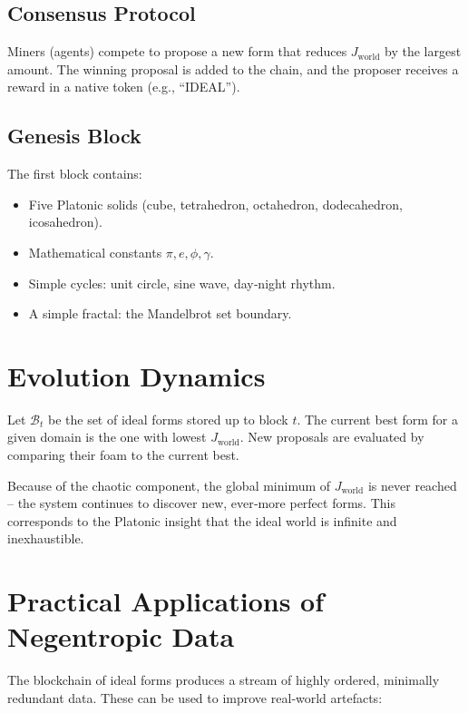 \documentclass[12pt,a4paper]{article}
\begin{document}
\subsection{Consensus Protocol}
Miners (agents) compete to propose a new form that reduces \(J_{\text{world}}\) by the largest amount. The winning proposal is added to the chain, and the proposer receives a reward in a native token (e.g., “IDEAL”).

\subsection{Genesis Block}
The first block contains:
\begin{itemize}
    \item Five Platonic solids (cube, tetrahedron, octahedron, dodecahedron, icosahedron).
    \item Mathematical constants \(\pi, e, \phi, \gamma\).
    \item Simple cycles: unit circle, sine wave, day‑night rhythm.
    \item A simple fractal: the Mandelbrot set boundary.
\end{itemize}

\section{Evolution Dynamics}

Let \(\mathcal{B}_t\) be the set of ideal forms stored up to block \(t\). The current best form for a given domain is the one with lowest \(J_{\text{world}}\). New proposals are evaluated by comparing their foam to the current best.

Because of the chaotic component, the global minimum of \(J_{\text{world}}\) is never reached – the system continues to discover new, ever‑more perfect forms. This corresponds to the Platonic insight that the ideal world is infinite and inexhaustible.

\section{Practical Applications of Negentropic Data}

The blockchain of ideal forms produces a stream of highly ordered, minimally redundant data. These can be used to improve real‑world artefacts:
\end{document}
